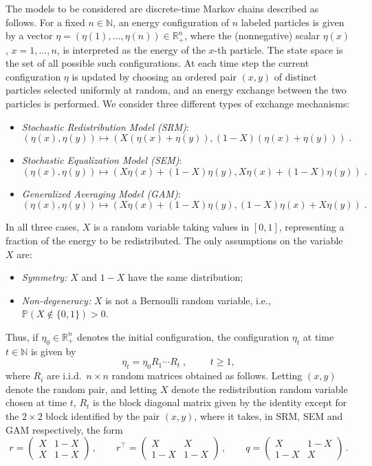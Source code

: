 \documentclass[11pt,reqno]{amsart}
\theoremstyle{remark}
\theoremstyle{definition}
\numberwithin{equation}{section}
\numberwithin{figure}{section}
\renewcommand{\P}{\mathds{P}}
\newcommand{\R}{\mathbb{R}}
\newcommand{\N}{\mathbb{N}}
\newcommand{\fstop}{\; \text{.}}
\newcommand{\comma}{\; \text{,}\;\;}
\begin{document}
The models to be considered are discrete-time Markov chains described as follows. 
For a fixed $n\in\N$, an energy configuration of $n$ labeled particles is given by a vector $\eta=(\eta(1),\ldots, \eta(n))\in \R_+^n$, where the (nonnegative) scalar $\eta(x)$, $x=1,\dots,n$, is interpreted as the energy of the $x$-th particle. The state space is the set of all possible such configurations. At each time step the current configuration $\eta$ is updated by  
choosing an ordered pair $(x,y)$ of distinct particles selected uniformly at random, and an energy exchange between the two particles is performed.  We consider three different types of exchange mechanisms:
\begin{itemize}
	\item \emph{Stochastic Redistribution Model {(SRM)}}: \[(\eta(x),\eta(y))\mapsto (X(\eta(x)+\eta(y)), (1-X)(\eta(x)+\eta(y)))\fstop\]
	\item \emph{Stochastic Equalization  Model {(SEM)}}: \[(\eta(x),\eta(y))\mapsto (X\eta(x)+(1-X)\eta(y), X\eta(x)+(1-X)\eta(y))\fstop\]
	\item \emph{Generalized Averaging Model {(GAM)}}: \[(\eta(x),\eta(y))\mapsto (X\eta(x)+(1-X)\eta(y), (1-X)\eta(x)+X\eta(y))\fstop\]
	\end{itemize}
In all three cases, $X$ is a random variable taking values in $[0,1]$, representing a fraction of the energy to be redistributed. The only assumptions on the variable $X$ are:
\begin{itemize}
	\item \emph{Symmetry:} $X$ and $1-X$ have the same distribution;
	\item \emph{Non-degeneracy:} $X$ is not a Bernoulli random variable, i.e., $	\P(X\not\in\{0,1\})>0$.
\end{itemize}
Thus, if $\eta_0\in \R_+^n$ denotes the initial configuration, the configuration $\eta_t$ at time $t\in\N$ is given by 
\begin{equation}\label{eq:repre}
	\eta_t = \eta_0 R_1\cdots R_t\comma\qquad t \ge 1,
\end{equation}
  where $R_i$ are i.i.d.\ $n\times n$ random matrices obtained as follows. Letting $(x,y)$ denote the random pair, and letting $X$ denote the redistribution random variable chosen at time $t$, $R_t$ is the block diagonal matrix given by the identity except for the $2\times 2$ block identified by the pair $(x,y)$, where it takes, in SRM, SEM and GAM respectively, the form
\begin{equation}\label{eq:repre1}
r=\begin{pmatrix} X & 1-X\\
		X & 1-X
	\end{pmatrix}\,,\qquad r^{\top}=\begin{pmatrix} X & X\\
		1-X & 1-X
	\end{pmatrix}\,,\qquad q=\begin{pmatrix} X & 1-X\\
		1-X & X
	\end{pmatrix}\,.
\end{equation}
\end{document}
